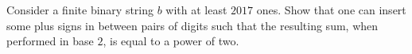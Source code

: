 Consider a finite binary string $b$ with at least $2017$ ones. Show that one can insert some plus signs in between pairs of digits such that the resulting sum, when performed in base $2$, is equal to a power of two.

